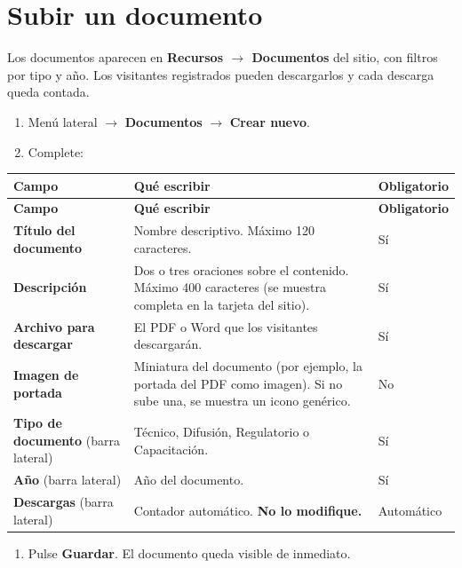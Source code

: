 \documentclass[11pt,letterpaper]{report}
\begin{document}
\section{Subir un documento}
Los documentos aparecen en \textbf{Recursos $\rightarrow$ Documentos} del sitio, con filtros por tipo y año. Los visitantes registrados pueden descargarlos y cada descarga queda contada.

\begin{enumerate}
  \item Menú lateral $\rightarrow$ \textbf{Documentos} $\rightarrow$ \textbf{Crear nuevo}.
  \item Complete:
\end{enumerate}
\begin{longtable}{>{\raggedright\arraybackslash}p{}>{\raggedright\arraybackslash}p{}>{\raggedright\arraybackslash}p{}}
\rowcolor{h2vazul}\textbf{\color{white}Campo} & \textbf{\color{white}Qué escribir} & \textbf{\color{white}Obligatorio} \\
\endfirsthead
\rowcolor{h2vazul}\textbf{\color{white}Campo} & \textbf{\color{white}Qué escribir} & \textbf{\color{white}Obligatorio} \\
\endhead
\textbf{Título del documento} & Nombre descriptivo. Máximo 120 caracteres. & Sí \\ \midrule
\rowcolor{filaalt}\textbf{Descripción} & Dos o tres oraciones sobre el contenido. Máximo 400 caracteres (se muestra completa en la tarjeta del sitio). & Sí \\ \midrule
\textbf{Archivo para descargar} & El PDF o Word que los visitantes descargarán. & Sí \\ \midrule
\rowcolor{filaalt}\textbf{Imagen de portada} & Miniatura del documento (por ejemplo, la portada del PDF como imagen). Si no sube una, se muestra un icono genérico. & No \\ \midrule
\textbf{Tipo de documento} (barra lateral) & Técnico, Difusión, Regulatorio o Capacitación. & Sí \\ \midrule
\rowcolor{filaalt}\textbf{Año} (barra lateral) & Año del documento. & Sí \\ \midrule
\textbf{Descargas} (barra lateral) & Contador automático. \textbf{No lo modifique.} & Automático \\ \bottomrule
\end{longtable}
\begin{enumerate}[start=3]
  \item Pulse \textbf{Guardar}. El documento queda visible de inmediato.
\end{enumerate}
\end{document}

